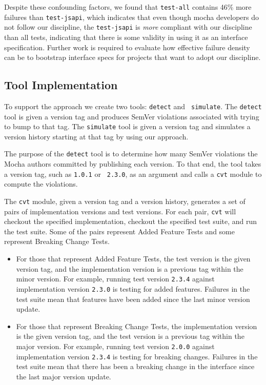 Despite these confounding factors, we found that {\tt test-all}
contains 46\% more failures than {\tt test-jsapi}, which indicates
that even though mocha developers do not follow our discipline, the
{\tt test-jsapi} is {\em more} compliant with our discipline than all
tests, indicating that there is some validity in using it as an
interface specification.  Further work is required to evaluate how
effective failure density can be to bootstrap interface specs for
projects that want to adopt our discipline.

\subsection{Tool Implementation}
To support the approach we create two tools: {\tt detect} and {\tt
  simulate}. The {\tt detect} tool is given a version tag and
produces SemVer violations associated with trying to bump to that
tag. The {\tt simulate} tool is given a version tag and simulates a
version history starting at that tag by using our approach.

The purpose of the {\tt detect} tool is to determine how many SemVer
violations the Mocha authors committed by publishing each version. To
that end, the tool takes a version tag, such as {\tt 1.0.1} or {\tt
  2.3.0}, as an argument and calls a {\tt cvt} module to compute the
violations.

The {\tt cvt} module, given a version tag and a version history,
generates a set of pairs of implementation versions and test
versions. For each pair, {\tt cvt} will checkout the specified
implementation, checkout the specified test suite, and run the test
suite. Some of the pairs represent Added Feature Tests and some
represent Breaking Change Tests.

\begin{itemize}
\item For those that represent Added Feature Tests, the test version
  is the given version tag, and the implementation version is a
  previous tag within the minor version. For example, running test
  version {\tt 2.3.4} against implementation version {\tt 2.3.0} is
  testing for added features. Failures in the test suite mean that
  features have been added since the last minor version update.
\item For those that represent Breaking Change Tests, the
  implementation version is the given version tag, and the test
  version is a previous tag within the major version. For example,
  running test version {\tt 2.0.0} against implementation version
  {\tt 2.3.4} is testing for breaking changes. Failures in the test
  suite mean that there has been a breaking change in the interface
  since the last major version update.
\end{itemize}

